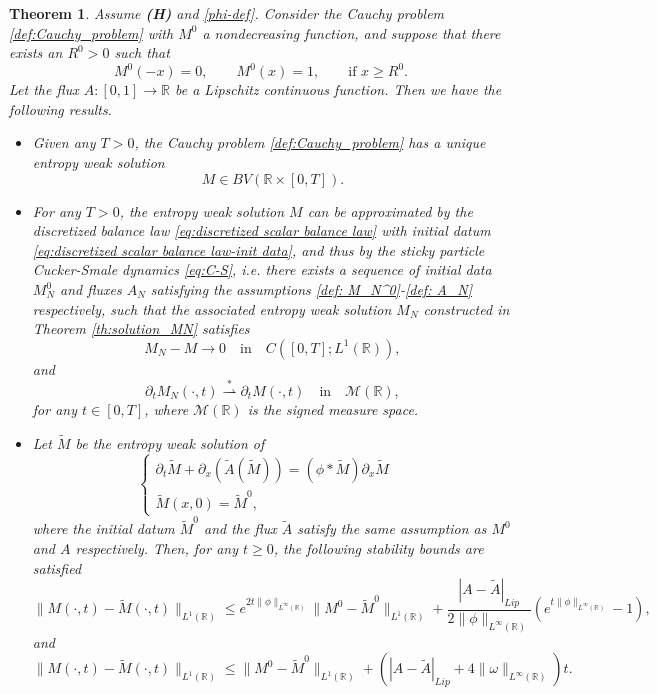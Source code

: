 \documentclass[11pt,a4paper,oneside]{amsart}
\newtheorem{theorem}[definition]{Theorem}
\newcommand\R{\mathbb{R}}
\begin{document}
\begin{theorem}\label{theorem:entropy-solution}
    Assume \textbf{(H)} and \eqref{phi-def}. Consider the Cauchy problem \eqref{def:Cauchy_problem} with $M^0$ a nondecreasing function, and
    suppose that there exists an $R^0>0$ such that
    $$
    M^0(-x)=0,\qquad M^0(x)=1,\qquad\text{if $x\geq R^0$}.
    $$
    Let the flux $A:[0,1]\to\R$ be a Lipschitz continuous function. Then we have the following results.
    \begin{itemize}
        \item[\textbf{(a)}] Given any $T>0$, the Cauchy problem \eqref{def:Cauchy_problem} has a unique entropy weak solution
        $$
        M\in BV(\R\times[0,T]).
        $$
        \item[\textbf{(b)}] For any $T>0$, the entropy weak solution $M$ can be approximated by the discretized balance law \eqref{eq:discretized scalar balance law} 
        with initial datum \eqref{eq:discretized scalar balance law-init data}, and thus by the sticky particle Cucker-Smale dynamics \eqref{eq:C-S}, 
        i.e. there exists a sequence of initial data $M_N^0$ and fluxes $A_N$ satisfying the assumptions \eqref{def: M_N^0}-\eqref{def: A_N} respectively, 
        such that the associated entropy weak solution $M_N$ constructed in Theorem \ref{th:solution_MN} satisfies
        \begin{equation}\label{eq:M_N-to-M}
            M_N-M\to0\quad\text{in}\quad C([0,T];L^1(\R)),
        \end{equation}
        and
        \begin{equation}\label{eq: dev-M_N-to-M}
            \partial_t M_N(\cdot,t)\overset{\ast}{\rightharpoonup} \partial_t M(\cdot,t)\quad\text{in}\quad \mathcal{M}(\R),
        \end{equation}
        for any $t\in[0,T]$, where $\mathcal{M}(\R)$ is the signed measure space.
        \item[\textbf{(c)}] Let $\tilde M$ be the entropy weak solution of 
        $$\begin{cases}
        \partial_t\tilde M+\partial_x(\tilde A(\tilde M))=(\phi\ast \tilde M)\partial_x\tilde M\quad\\\tilde M(x,0)=\tilde M^0,
        \end{cases}
        $$
        where the initial datum $\tilde M^0$ and the flux $\tilde A$ satisfy the same assumption as $M^0$ and $A$ respectively. 
        Then, for any $t\geq0$, the following stability bounds are satisfied
        \begin{equation}\label{eq:stability-estimate}
            \|M(\cdot,t)-\tilde M(\cdot,t)\|_{L^1(\R)}\leq e^{2t\|\phi\|_{L^\infty(\R)}}\|M^0-\tilde M^0\|_{L^1(\R)}+\frac{|A-\tilde A|_{Lip}}{2\|\phi\|_{L^\infty(\R)}}(e^{t\|\phi\|_{L^\infty(\R)}}-1),
        \end{equation}
        and
        \begin{equation}\label{eq:stability-estimate-two}
            \|M(\cdot,t)-\tilde M(\cdot,t)\|_{L^1(\R)}\leq \|M^0-\tilde M^0\|_{L^1(\R)}+(|A-\tilde A|_{Lip}+4\|\omega\|_{L^\infty(\R)})t.
        \end{equation}
    \end{itemize}
\end{theorem}
\end{document}
